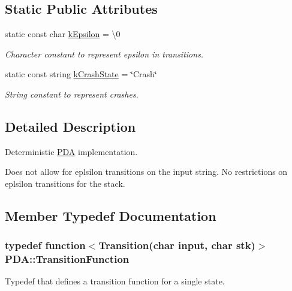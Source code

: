 \subsection*{Static Public Attributes}
\begin{DoxyCompactItemize}
\item 
static const char \hyperlink{classPDA_a508f4982a6a56f61cab39f4e7a7e0268}{k\+Epsilon} = \textquotesingle{}\textbackslash{}0\textquotesingle{}\hypertarget{classPDA_a508f4982a6a56f61cab39f4e7a7e0268}{}\label{classPDA_a508f4982a6a56f61cab39f4e7a7e0268}

\begin{DoxyCompactList}\small\item\em Character constant to represent epsilon in transitions. \end{DoxyCompactList}\item 
static const string \hyperlink{classPDA_adbe613972feb034bc00aee9b4eacfaf6}{k\+Crash\+State} = \char`\"{}Crash\char`\"{}\hypertarget{classPDA_adbe613972feb034bc00aee9b4eacfaf6}{}\label{classPDA_adbe613972feb034bc00aee9b4eacfaf6}

\begin{DoxyCompactList}\small\item\em String constant to represent crashes. \end{DoxyCompactList}\end{DoxyCompactItemize}


\subsection{Detailed Description}
Deterministic \hyperlink{classPDA}{P\+DA} implementation.

Does not allow for eplsilon transitions on the input string. No restrictions on eplsilon transitions for the stack. 

\subsection{Member Typedef Documentation}
\subsubsection[{\texorpdfstring{Transition\+Function}{TransitionFunction}}]{\setlength{\rightskip}{0pt plus 5cm}typedef function$<${\bf Transition}(char input, char stk)$>$ {\bf P\+D\+A\+::\+Transition\+Function}}\hypertarget{classPDA_a4f001a9e4d59473ff532a7f0bfe726d7}{}\label{classPDA_a4f001a9e4d59473ff532a7f0bfe726d7}
Typedef that defines a transition function for a single state.


